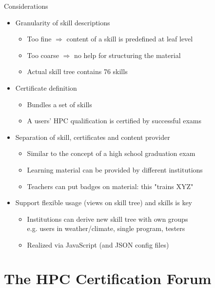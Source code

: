 \documentclass[compress,aspectratio=169]{beamer}
\begin{document}
\begin{frame}{Considerations}
	\begin{itemize}
		\item Granularity of skill descriptions
		\begin{itemize}
			\item Too fine $\Rightarrow$ content of a skill is predefined at leaf level
			\item Too coarse $\Rightarrow$ no help for structuring the material
			\item Actual skill tree contains 76 skills
		\end{itemize}

		\item Certificate definition
		\begin{itemize}
			\item Bundles a set of skills %
			\item A users' HPC qualification is certified by successful exams
		\end{itemize}
		\item Separation of skill, certificates and content provider
		\begin{itemize}
			\item Similar to the concept of a high school graduation exam %
			\item Learning material can be provided by different institutions
			\item Teachers can put badges on material: this "trains XYZ"
		\end{itemize}
		\item Support flexible usage (views on skill tree) and skills is key
			\begin{itemize}
				\item Institutions can derive new skill tree with own groups \\
				e.g. users in weather/climate, single program, testers
				\item Realized via JavaScript (and JSON config files)
			\end{itemize}
	\end{itemize}
\end{frame}


\section{The HPC Certification Forum}
\sectionIntroHidden
\end{document}
